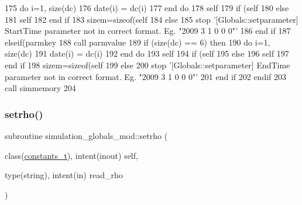 \begin{DoxyCode}
175             \textcolor{keywordflow}{do} i=1, \textcolor{keyword}{size}(dc)
176                 date(i) = dc(i)%
177 \textcolor{keywordflow}{            end do}
178             self%
179             \textcolor{keywordflow}{if} (self%
180             \textcolor{keywordflow}{else}
181                 self%
182 \textcolor{keywordflow}{            end if}
183             sizem=sizeof(self%
184         \textcolor{keywordflow}{else}
185             stop \textcolor{stringliteral}{'[Globals::setparameter] StartTime parameter not in correct format. Eg. "2009 3 1 0 0 0"'}
186 \textcolor{keywordflow}{        end if}
187     \textcolor{keywordflow}{elseif}(parmkey%
188         \textcolor{keyword}{call }parmvalue%
189         \textcolor{keywordflow}{if} (\textcolor{keyword}{size}(dc) == 6) \textcolor{keywordflow}{then}
190             \textcolor{keywordflow}{do} i=1, \textcolor{keyword}{size}(dc)
191                 date(i) = dc(i)%
192 \textcolor{keywordflow}{            end do}
193             self%
194             \textcolor{keywordflow}{if} (self%
195             \textcolor{keywordflow}{else}
196                 self%
197 \textcolor{keywordflow}{            end if}
198             sizem=sizeof(self%
199         \textcolor{keywordflow}{else}
200             stop \textcolor{stringliteral}{'[Globals::setparameter] EndTime parameter not in correct format. Eg. "2009 3 1 0 0 0"'}
201 \textcolor{keywordflow}{        end if}
202 \textcolor{keywordflow}{    endif}
203     \textcolor{keyword}{call }simmemory%
204 
\end{DoxyCode}
\mbox{\label{namespacesimulation__globals__mod_a68a87c39cf88bad353e28e367a721ed4}} 
\subsubsection{\texorpdfstring{setrho()}{setrho()}}
{\footnotesize\ttfamily subroutine simulation\+\_\+globals\+\_\+mod\+::setrho (\begin{DoxyParamCaption}\item[{class(\mbox{\hyperlink{structsimulation__globals__mod_1_1constants__t}{constants\+\_\+t}}), intent(inout)}]{self,  }\item[{type(string), intent(in)}]{read\+\_\+rho }\end{DoxyParamCaption})\hspace{0.3cm}{\ttfamily [private]}}



